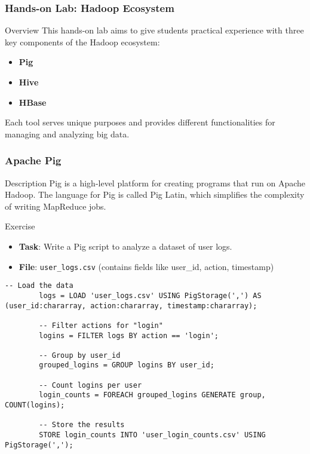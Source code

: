 \documentclass[aspectratio=169]{beamer}
\begin{document}
\begin{frame}
    \frametitle{Hands-on Lab: Hadoop Ecosystem}
    \begin{block}{Overview}
        This hands-on lab aims to give students practical experience with three key components of the Hadoop ecosystem:
        \begin{itemize}
            \item \textbf{Pig}
            \item \textbf{Hive}
            \item \textbf{HBase}
        \end{itemize}
        Each tool serves unique purposes and provides different functionalities for managing and analyzing big data.
    \end{block}
\end{frame}

\begin{frame}[fragile]
    \frametitle{Apache Pig}
    \begin{block}{Description}
        Pig is a high-level platform for creating programs that run on Apache Hadoop. The language for Pig is called Pig Latin,
        which simplifies the complexity of writing MapReduce jobs.
    \end{block}
    
    \begin{block}{Exercise}
        \begin{itemize}
            \item \textbf{Task}: Write a Pig script to analyze a dataset of user logs.
            \item \textbf{File}: \texttt{user\_logs.csv} (contains fields like user\_id, action, timestamp)
        \end{itemize}
    \end{block}

    \begin{lstlisting}[language=Pig]
        -- Load the data
        logs = LOAD 'user_logs.csv' USING PigStorage(',') AS (user_id:chararray, action:chararray, timestamp:chararray);

        -- Filter actions for "login"
        logins = FILTER logs BY action == 'login';

        -- Group by user_id
        grouped_logins = GROUP logins BY user_id;

        -- Count logins per user
        login_counts = FOREACH grouped_logins GENERATE group, COUNT(logins);

        -- Store the results
        STORE login_counts INTO 'user_login_counts.csv' USING PigStorage(',');
    \end{lstlisting}
\end{frame}
\end{document}
